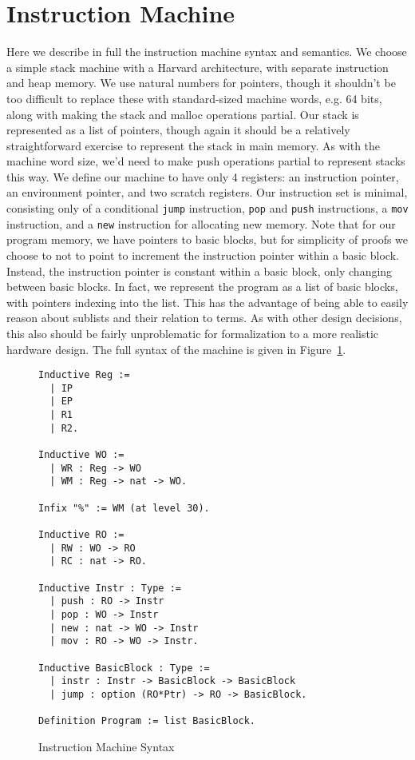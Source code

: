 \section{Instruction Machine} \label{sec:im_semantics}

Here we describe in full the instruction machine syntax and semantics. We
choose a simple stack machine with a Harvard architecture, with separate
instruction and heap memory. We use natural numbers for pointers, though it
shouldn't be too difficult to replace these with standard-sized machine words,
e.g. 64 bits, along with making the stack and malloc operations partial. Our
stack is represented as a list of pointers, though again it should be a
relatively straightforward exercise to represent the stack in main memory. As
with the machine word size, we'd need to make push operations partial to
represent stacks this way. We define our machine to have only 4 registers: an
instruction pointer, an environment pointer, and two scratch registers. Our
instruction set is minimal, consisting only of a conditional \texttt{jump}
instruction, \texttt{pop} and \texttt{push} instructions, a \texttt{mov}
instruction, and a \texttt{new} instruction for allocating new memory. Note that
for our program memory, we have pointers to basic blocks, but for simplicity of
proofs we choose to not to point to increment the instruction pointer within a
basic block.  Instead, the instruction pointer is constant within a basic
block, only changing between basic blocks. In fact, we represent the program as
a list of basic blocks, with pointers indexing into the list. This has the
advantage of being able to easily reason about sublists and their relation to
terms. As with other design decisions, this also should be fairly unproblematic
for formalization to a more realistic hardware design. The full syntax of the
machine is given in Figure~\ref{fig:im_syntax}.  

\begin{figure}
\begin{lstlisting}
Inductive Reg := 
  | IP
  | EP
  | R1
  | R2.

Inductive WO := 
  | WR : Reg -> WO
  | WM : Reg -> nat -> WO.

Infix "%" := WM (at level 30).

Inductive RO := 
  | RW : WO -> RO
  | RC : nat -> RO.

Inductive Instr : Type :=
  | push : RO -> Instr
  | pop : WO -> Instr
  | new : nat -> WO -> Instr 
  | mov : RO -> WO -> Instr.

Inductive BasicBlock : Type :=
  | instr : Instr -> BasicBlock -> BasicBlock
  | jump : option (RO*Ptr) -> RO -> BasicBlock.

Definition Program := list BasicBlock.
\end{lstlisting}
\caption{Instruction Machine Syntax}
\label{fig:im_syntax}
\end{figure}

